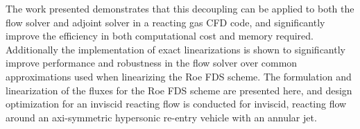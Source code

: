 The work presented demonstrates that this decoupling can be applied to both the
flow solver and adjoint solver in a reacting gas CFD code, and significantly
improve the efficiency in both computational cost and memory required.
Additionally the implementation of exact linearizations is shown to
significantly improve performance and robustness in the flow solver over common
approximations used when linearizing the Roe FDS scheme.  The formulation and
linearization of the fluxes for the Roe FDS scheme are presented here, and
design optimization for an inviscid reacting flow is conducted for inviscid,
reacting flow around an axi-symmetric hypersonic re-entry vehicle with an
annular jet.

